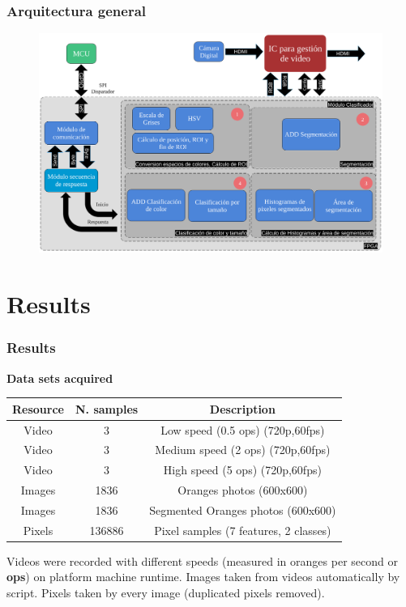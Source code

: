 \documentclass[
serif,
compress,
xcolor=table,
dvipsnames,
]{beamer}
\begin{document}
\begin{frame}
	\frametitle{Arquitectura general}
	
	\begin{figure}[h]
		\centering
		\includegraphics[width=0.9\linewidth]{F/arquitectura}  
		\label{weki}
	\end{figure}
	
	
\end{frame}



\section{Results}

\begin{frame}
\frametitle{Results}
\textbf{Data sets acquired}

\begin{table}[h]
\centering
    \begin{tabular}{|c|c|c|}
    \hline
    Resource & N. samples & Description\\
        \hline
    Video  & 3 & Low speed (0.5 ops) (720p,60fps)\\
        \hline
    Video  & 3 & Medium speed (2 ops) (720p,60fps)\\
        \hline
    Video  & 3 & High speed (5 ops) (720p,60fps)\\
        \hline
    Images & 1836 & Oranges photos (600x600)\\
        \hline
    Images & 1836 & Segmented Oranges photos (600x600)\\
        \hline
    Pixels & 136886 & Pixel samples (7 features, 2 classes)\\
        \hline
    \end{tabular}
    
    \label{dst}
\end{table}

Videos were recorded with different speeds (measured in oranges per second or \textbf{ops}) on platform machine runtime. Images taken from videos automatically by script. Pixels taken by every image (duplicated pixels removed).


\end{frame}
\end{document}
